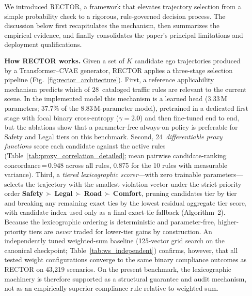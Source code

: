 We introduced \textsc{RECTOR}, a framework that elevates trajectory selection from a simple probability check to a rigorous, rule-governed decision process.  The discussion below first recapitulates the mechanism, then summarizes the empirical evidence, and finally consolidates the paper's principal limitations and deployment qualifications.

\textbf{How RECTOR works.}
Given a set of $K$ candidate ego trajectories produced by a Transformer--CVAE generator, RECTOR applies a three-stage selection pipeline (Fig.~\ref{fig:rector_architecture}).  First, a reference applicability mechanism predicts which of 28~cataloged traffic rules are relevant to the current scene.  In the implemented model this mechanism is a learned head (3.33\,M parameters; 37.7\% of the 8.83\,M-parameter model), pretrained in a dedicated first stage with focal binary cross-entropy ($\gamma{=}2.0$) and then fine-tuned end to end, but the ablations show that a parameter-free always-on policy is preferable for Safety and Legal tiers on this benchmark.  Second, 24~\emph{differentiable proxy functions} score each candidate against the active rules (Table~\ref{tab:proxy_correlation_detailed}; mean pairwise candidate-ranking concordance\,=\,0.948 across all rules, 0.875 for the 10 rules with measurable variance).  Third, a \emph{tiered lexicographic scorer}---with zero trainable parameters---selects the trajectory with the smallest violation vector under the strict priority order \textbf{Safety\,$\succ$\,Legal\,$\succ$\,Road\,$\succ$\,Comfort}, pruning candidates tier by tier and breaking any remaining exact ties by the lowest residual aggregate tier score, with candidate index used only as a final exact-tie fallback (Algorithm~2).  Because the lexicographic ordering is deterministic and parameter-free, higher-priority tiers are \emph{never} traded for lower-tier gains by construction.  An independently tuned weighted-sum baseline (125-vector grid search on the canonical checkpoint; Table~\ref{tab:ws_independent}) confirms, however, that all tested weight configurations converge to the same binary compliance outcomes as RECTOR on 43{,}219 scenarios.  On the present benchmark, the lexicographic machinery is therefore supported as a structural guarantee and audit mechanism, not as an empirically superior compliance rule relative to weighted-sum.

